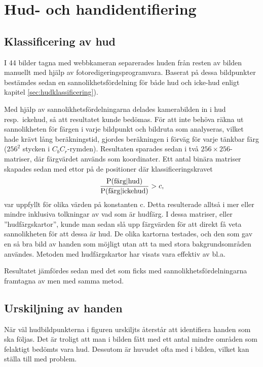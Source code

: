 \section{Hud- och handidentifiering}

\subsection{Klassificering av hud}
I 44 bilder tagna med webbkameran separerades huden från resten av
bilden manuellt med hjälp av fotoredigeringsprogramvara. Baserat på
dessa bildpunkter bestämdes sedan en sannolikhetsfördelning för både hud
och icke-hud enligt kapitel \ref{sec:hudklassificering}). 

Med hjälp av
sannolikhetsfördelningarna delades kamerabilden in i hud
resp.~ickehud, så att resultatet kunde bedömas. För att inte behöva
räkna ut sannolikheten för färgen i varje bildpunkt och bildruta
som analyseras,
vilket hade krävt lång beräkningstid, gjordes beräkningen
i förväg för varje tänkbar färg ($256^2$ stycken i
$C_bC_r$-rymden). Resultaten sparades
sedan i två $256\times256$-matriser, där färgvärdet används som
koordinater. Ett antal binära matriser skapades sedan med ettor på de
positioner där klassificeringskravet 
\begin{equation*}
	\frac{\mathrm{P}(\textrm{färg}|\textrm{hud})}{\mathrm{P}(\textrm{färg}|\textrm{ickehud})} > c,
\end{equation*}
var uppfyllt för olika värden på konstanten c. Detta resulterade alltså i mer
eller mindre inklusiva tolkningar av vad som är hudfärg. I dessa matriser, eller
''hudfärgskartor'', kunde man sedan slå upp
färgvärden för att direkt få veta sannolikheten för att dessa är
hud. 
De olika kartorna testades, och den som gav en så bra bild av
handen som möjligt utan att ta med stora bakgrundsområden användes.
Metoden med hudfärgskartor har visats vara effektiv av bl.a.~

Resultatet jämfördes sedan med det som ficks med
sannolikhetsfördelningarna framtagna av  men
med samma metod.

\subsection{Urskiljning av handen}\label{sec:metod_hud:urskiljning}
När väl hudbildpunkterna i figuren urskiljts återstår att 
identifiera handen som ska följas. Det är troligt att man i bilden
fått med ett antal mindre områden som felaktigt bedömts vara
hud. Dessutom är huvudet ofta med i bilden, vilket kan ställa till med
problem. 

